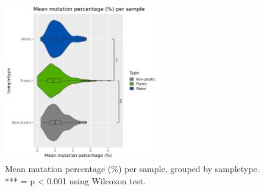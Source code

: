 \begin{figure}[h!]
    \centering
    \includegraphics[width = 0.6\textwidth]{figure/mean_samples_sampletype.png}
    \caption{Mean mutation percentage (\%) per sample, grouped by sampletype. *** = p < 0.001 using Wilcoxon test.}
    \label{mean_samples_sampletype}
\end{figure}


